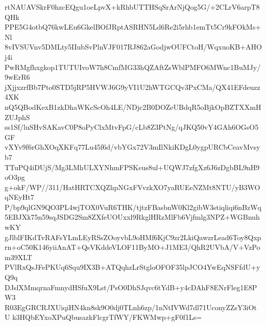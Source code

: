 rtNAUAVSkrF0hzcEQgu1oeLpvX+kRhbUTTHSqSrArNjQog5G/+2CLrV6arpT8QHk
PPE5G4otbQ76kwLEu6GkelBOfJRptASRHN5Ld6Re2i5rhb1emTt5Cr9kFOkMs+Nl
8vIVSUVnv5DMLty5IIubSvPlnVJF017RJ862aGodjwOUFCtoH/WqxuoKB+AHOj4i
PwRMgfhxgkop1TUTUIvoW7h8CmfMG33hQZAftZsWblPMFO6MWnc1BuMJy/9wErR6
jXjjxzrfBb7Pto0STD5jRP5HVWJ6G9yVI1U2hWTGCQv3PxCMa/QX41EFdeuzz4XK
nQ5QBodKexB1zkDhaWKcScOh4LE/NDjc2B0DOZeUBdqR5oBjkOpBZTXXmHZUJphS
ss1Sf/luSHvSAKavC0P8oPyClxMtvFpG/cLb8Z3PtNg/qJKQ50vY4GAh6OGsO5GF
vXYv9f6rGhXOqXKFq77Lu45f6d/vbYGx72V3mIlNkiKDgL0ygpURCbCeavMvsyb7
TTuPQ4iDUjS/Mg3LMhULXYNhmFPSKeus8ul+UQWJ7zfgXz6J6zDgbBL9nH9oO3pg
g+okF/WP//311/HatHRTCXQZhpNGxFVvzkXO7yaRUEeNZMt8NTU/yB3WOqNEyHt7
P/bp9qlGN9QO3PL4wjTOX0VuR6THK/tjtzFBasbnW0Kl2gibW3stiqliqi6nBzWq
5EBJXk75n59sqJSDG2Sm8ZXfeUOUxxl9RkglHRzMlFb6Vjfmlg3NPZ+WGBnuhwKY
gJlblFIKdTvRAFsYLmLEyRSsZOoyvbL9oHMf6KjC9zr2LkiQawzrLead6Toy8Qxp
rn+oC50K146yiiAnAT+QsVKddeVLOF11ByMO+J1ME3/QhR2UVbA/V+VzPom39XLT
PVlRxQsJFePKUq6Squ9IX3B+ATQqhzLrStgloOFOF35lpJCO4YwEqNSFfdU+yQ9q
DJslXMmqrnaFmnydHSfuX9Lst/PsO0DhSJqvc6tYdB+y4cDAhF8ENrFleg1E8PW3
R03EgGRCRJXUiqiHN4kn8sk9O0dj0TLnh6zp/1nNtIVWd7dl71UconyZZsY3iOtU
k3HQbEYxoXPuQbusazkFlcgrTfWY/FKWMwp+gF0f1Ls=
